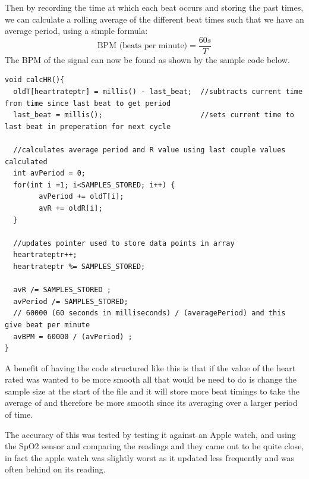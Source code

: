 \documentclass{article}
\begin{document}
Then by recording the time at which each beat occurs and storing the past times, we can calculate a rolling average of the different beat times such that we have an average period, using a simple formula:
\begin{equation}
    \text{BPM (beats per minute)} =  \frac{60s}{T}
\end{equation}
The BPM of the signal can now be found as shown by the sample code below.
\begin{lstlisting}[language=Arduino, caption= HR Calculation Code]
void calcHR(){
  oldT[heartrateptr] = millis() - last_beat;  //subtracts current time from time since last beat to get period
  last_beat = millis();                       //sets current time to last beat in preperation for next cycle
  
  //calculates average period and R value using last couple values calculated
  int avPeriod = 0;
  for(int i =1; i<SAMPLES_STORED; i++) {
        avPeriod += oldT[i];
        avR += oldR[i];
  }
  
  //updates pointer used to store data points in array
  heartrateptr++;
  heartrateptr %= SAMPLES_STORED;
  
  avR /= SAMPLES_STORED ;
  avPeriod /= SAMPLES_STORED;
  // 60000 (60 seconds in milliseconds) / (averagePeriod) and this give beat per minute 
  avBPM = 60000 / (avPeriod) ;
}
\end{lstlisting}
A benefit of having the code structured like this is that if the value of the heart rated was wanted to be more smooth all that would be need to do is change the sample size at the start of the file and it will store more beat timings to take the average of and therefore be more smooth since its averaging over a larger period of time.

The accuracy of this was tested by testing it against an Apple watch, and using the SpO2 sensor and comparing the readings and they came out to be quite close, in fact the apple watch was slightly worst as it updated less frequently and was often behind on its reading.
\newpage
\end{document}
